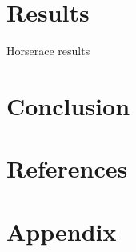 \documentclass[12pt, a4paper]{article}
\begin{document}
\section{Results}


\begin{table}[p]
\begin{center}
\label{tbl:horse}

\caption{Horserace results}
\end{center}
\end{table}

\section{Conclusion}

\section{References}

\section{Appendix}
\end{document}
